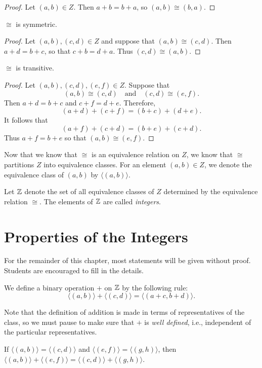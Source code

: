 \begin{proof}
Let $(a,b)\in Z$.  Then $a+b=b+a$, so $(a,b)\cong(b,a)$.
\end{proof}

\begin{lemma}
$\cong$ is symmetric.
\end{lemma}

\begin{proof} Let $(a,b),(c,d)\in Z$ and suppose
that $(a,b)\cong (c,d)$.  Then $a+d=b+c$, so that
$c+b=d+a$.  Thus $(c,d)\cong (a,b)$.
\end{proof}

\begin{lemma}
$\cong$ is transitive.
\end{lemma}

\begin{proof}
Let $(a,b), (c,d), (e,f)\in Z$.  Suppose that
\[
(a,b)\cong(c,d)\quad\text{and}\quad (c,d)\cong (e,f).
\]
Then $a+d=b+c$ and $c+f=d+e$.  Therefore,
\[
(a+d)+(c+f) =(b+c)+(d+e).
\]
It follows that
\[
(a+f)+(c+d) =(b+e)+(c+d).
\]
Thus $a+f = b+e$ so that $(a,b)\cong(e,f)$.
\end{proof}

Now that we know that $\cong$ is an equivalence relation on
$Z$, we know that $\cong$ partitions $Z$ into equivalence classes.
For an element $(a,b)\in Z$, we denote the equivalence class
of $(a,b)$ by $\langle (a,b)\rangle$.

Let $\mathbb{Z}$ denote the set of all equivalence classes of $Z$
determined by the equivalence relation $\cong$.  The elements
of $\mathbb{Z}$ are called \textit{integers}.

\section{Properties of the Integers}\label{s:moreintegers}

For the remainder of this chapter, most statements will be given
without proof.  Students are encouraged to fill in the
details.  

We define a binary operation $+$ on $\mathbb{Z}$ by the following rule:
\[
\langle(a,b)\rangle+\langle(c,d)\rangle = \langle(a+c,b+d)\rangle.  
\]

Note that the definition of addition is made in terms of 
representatives of the class, so we must pause to make sure
that $+$ is \textit{well defined}, i.e., independent of
the particular representatives.

\begin{lemma}
If $\langle(a,b)\rangle =\langle(c,d)\rangle$ and 
$\langle(e,f)\rangle=\langle(g,h)\rangle$, then
$\langle(a,b)\rangle+\langle(e,f)\rangle=
\langle(c,d)\rangle+\langle(g,h)\rangle$.
\end{lemma}

